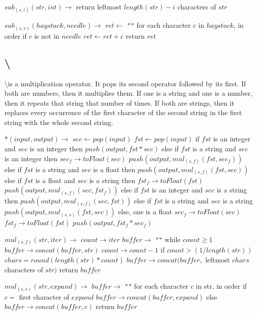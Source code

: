 \documentclass{article}
\let\bs\textbackslash
\def\pc{\bigskip\obeylines\parindent=0pt}
\begin{document}
{{{{{{\pc $sub_{(s,i)}(str, int) \rightarrow$
\quad return leftmost $length(str) - i$ characters of $str$

\pc $sub_{(s,s)}(haystack, needle) \rightarrow$
\quad $ret \leftarrow$ \texttt{""}
\quad for each character $c$ in $haystack$, in order
\quad \quad if $c$ is not in $needle$
\quad \quad \quad $ret \leftarrow ret + c$
\quad return $ret$
}

\subsection{\bs *}

\bs * is a multiplication operator.  It pops its second operator followed by its first.  If both are numbers, then it multiplies them.  If one is a string and one is a number, then it repeats that string that number of times.  If both are strings, then it replaces every occurrence of the first character of the second string in the first string with the whole second string.

{\pc
$*(input, output) \rightarrow$
\quad $sec \leftarrow pop(input)$
\quad $fst \leftarrow pop(input)$
\quad if $fst$ is an integer and $sec$ is an integer then
\quad \quad $push(output, fst * sec)$
\quad else if $fst$ is a string and $sec$ is an integer then
\quad \quad $sec_f \rightarrow toFloat(sec)$
\quad \quad $push(output, mul_{(s,f)}(fst, sec_f))$
\quad else if $fst$ is a string and $sec$ is a float then
\quad \quad $push(output, mul_{(s,f)}(fst, sec))$
\quad else if $fst$ is a float and $sec$ is a string then
\quad \quad $fst_f \rightarrow toFloat(fst)$
\quad \quad $push(output, mul_{(s,f)}(sec, fst_f))$
\quad else if $fst$ is an integer and $sec$ is a string then
\quad \quad $push(output, mul_{(s,f)}(sec, fst))$
\quad else if $fst$ is a string and $sec$ is a string
\quad \quad $push(output, mul_{(s,s)}(fst, sec))$
\quad else, one is a float
\quad \quad $sec_f \rightarrow toFloat(sec)$
\quad \quad $fst_f \rightarrow toFloat(fst)$
\quad \quad $push(output, fst_f*sec_f)$

\pc $mul_{(s,f)}(str, iter) \rightarrow$
\quad $count \rightarrow iter$
\quad $buffer \rightarrow$ \texttt{""}
\quad while $count \geq 1$
\quad \quad $buffer \rightarrow concat(buffer, str)$
\quad \quad $count \rightarrow count - 1$
\quad if $count > (1 / length(str))$
\quad \quad $chars = round(length(str) * count)$
\quad \quad $buffer \rightarrow concat(buffer,$ leftmost $chars$ characters of $str)$
\quad return $buffer$

\pc $mul_{(s,s)}(str, expand) \rightarrow$
\quad $buffer \rightarrow$ \texttt{""}
\quad for each character $c$ in str, in order
\quad \quad if $c =$ first character of $expand$
\quad \quad \quad $buffer \rightarrow concat(buffer, expand)$
\quad \quad else
\quad \quad \quad $buffer \rightarrow concat(buffer, c)$
\quad return $buffer$
}

}}}}}
\end{document}

